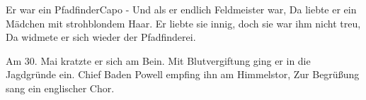 \begin{song}{Er war ein Pfadfinder}{}{Capo -}
Und als er endlich Feldmeister war,
Da liebte er ein Mädchen mit strohblondem Haar.
Er liebte sie innig, doch sie war ihm nicht treu,
Da widmete er sich wieder der Pfadfinderei.

 

Am 30. Mai kratzte er sich am Bein.
Mit Blutvergiftung ging er in die Jagdgründe ein.
Chief Baden Powell empfing ihn am Himmelstor,
Zur Begrüßung sang ein englischer Chor.

 

\end{song}